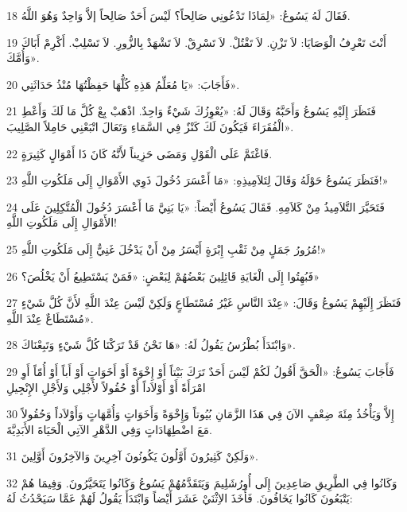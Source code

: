 \par 18 فَقَالَ لَهُ يَسُوعُ: «لِمَاذَا تَدْعُونِي صَالِحاً؟ لَيْسَ أَحَدٌ صَالِحاً إلاَّ وَاحِدٌ وَهُوَ اللَّهُ.
\par 19 أَنْتَ تَعْرِفُ الْوَصَايَا: لاَ تَزْنِ. لاَ تَقْتُلْ. لاَ تَسْرِقْ. لاَ تَشْهَدْ بِالزُّورِ. لاَ تَسْلِبْ. أَكْرِمْ أَبَاكَ وَأُمَّكَ».
\par 20 فَأَجَابَ: «يَا مُعَلِّمُ هَذِهِ كُلُّهَا حَفِظْتُهَا مُنْذُ حَدَاثَتِي».
\par 21 فَنَظَرَ إِلَيْهِ يَسُوعُ وَأَحَبَّهُ وَقَالَ لَهُ: «يُعْوِزُكَ شَيْءٌ وَاحِدٌ. اذْهَبْ بِعْ كُلَّ مَا لَكَ وَأَعْطِ الْفُقَرَاءَ فَيَكُونَ لَكَ كَنْزٌ فِي السَّمَاءِ وَتَعَالَ اتْبَعْنِي حَامِلاً الصَّلِيبَ».
\par 22 فَاغْتَمَّ عَلَى الْقَوْلِ وَمَضَى حَزِيناً لأَنَّهُ كَانَ ذَا أَمْوَالٍ كَثِيرَةٍ.
\par 23 فَنَظَرَ يَسُوعُ حَوْلَهُ وَقَالَ لِتَلاَمِيذِهِ: «مَا أَعْسَرَ دُخُولَ ذَوِي الأَمْوَالِ إِلَى مَلَكُوتِ اللَّهِ!»
\par 24 فَتَحَيَّرَ التَّلاَمِيذُ مِنْ كَلاَمِهِ. فَقَالَ يَسُوعُ أَيْضاً: «يَا بَنِيَّ مَا أَعْسَرَ دُخُولَ الْمُتَّكِلِينَ عَلَى الأَمْوَالِ إِلَى مَلَكُوتِ اللَّهِ!
\par 25 مُرُورُ جَمَلٍ مِنْ ثَقْبِ إِبْرَةٍ أَيْسَرُ مِنْ أَنْ يَدْخُلَ غَنِيٌّ إِلَى مَلَكُوتِ اللَّهِ!»
\par 26 فَبُهِتُوا إِلَى الْغَايَةِ قَائِلِينَ بَعْضُهُمْ لِبَعْضٍ: «فَمَنْ يَسْتَطِيعُ أَنْ يَخْلُصَ؟»
\par 27 فَنَظَرَ إِلَيْهِمْ يَسُوعُ وَقَالَ: «عِنْدَ النَّاسِ غَيْرُ مُسْتَطَاعٍ وَلَكِنْ لَيْسَ عِنْدَ اللَّهِ لأَنَّ كُلَّ شَيْءٍ مُسْتَطَاعٌ عِنْدَ اللَّهِ».
\par 28 وَابْتَدَأَ بُطْرُسُ يَقُولُ لَهُ: «هَا نَحْنُ قَدْ تَرَكْنَا كُلَّ شَيْءٍ وَتَبِعْنَاكَ».
\par 29 فَأَجَابَ يَسُوعُ: «الْحَقَّ أَقُولُ لَكُمْ لَيْسَ أَحَدٌ تَرَكَ بَيْتاً أَوْ إِخْوَةً أَوْ أَخَوَاتٍ أَوْ أَباً أَوْ أُمّاً أَوِ امْرَأَةً أَوْ أَوْلاَداً أَوْ حُقُولاً لأَجْلِي وَلأَجْلِ الإِنْجِيلِ
\par 30 إِلاَّ وَيَأْخُذُ مِئَةَ ضِعْفٍ الآنَ فِي هَذَا الزَّمَانِ بُيُوتاً وَإِخْوَةً وَأَخَوَاتٍ وَأُمَّهَاتٍ وَأَوْلاَداً وَحُقُولاً مَعَ اضْطِهَادَاتٍ وَفِي الدَّهْرِ الآتِي الْحَيَاةَ الأَبَدِيَّةَ.
\par 31 وَلَكِنْ كَثِيرُونَ أَوَّلُونَ يَكُونُونَ آخِرِينَ وَالآخِرُونَ أَوَّلِينَ».
\par 32 وَكَانُوا فِي الطَّرِيقِ صَاعِدِينَ إِلَى أُورُشَلِيمَ وَيَتَقَدَّمُهُمْ يَسُوعُ وَكَانُوا يَتَحَيَّرُونَ. وَفِيمَا هُمْ يَتْبَعُونَ كَانُوا يَخَافُونَ. فَأَخَذَ الاِثْنَيْ عَشَرَ أَيْضاً وَابْتَدَأَ يَقُولُ لَهُمْ عَمَّا سَيَحْدُثُ لَهُ:
